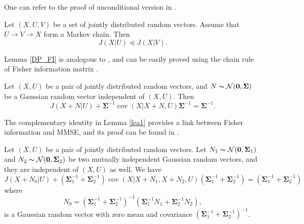 \documentclass[journal,final, onecolumn]{IEEEtran}
\DeclareMathOperator{\cov}{cov}
\begin{document}
One can refer to the proof of unconditional version in \cite[Theorem 20]{DCT91}.
\smallskip
\begin{lemma}  \label{DP_FI}
Let $({X}, U, V)$ be a set of jointly distributed random vectors. Assume that $U \rightarrow V \rightarrow {X}$ form a Markov chain. Then
\begin{equation}
J({X} | U) \preceq J({X} | V).
\end{equation}
\end{lemma}

Lemma \ref{DP_FI} is analogous to \cite[Lemma 3]{Z98}, and can be easily proved using the chain rule of Fisher information matrix \cite[Lemma 1]{Z98}.



\begin{lemma}\label{lea1}
Let $(X, U)$ be a pair of jointly distributed random vectors, and $N \thicksim \mathcal{N}(\boldsymbol{0}, \boldsymbol{\Sigma})$ be a Gaussian random vector independent of  $(X, U)$.  Then
\begin{equation}
 J(X + N | U) + \boldsymbol{\Sigma}^{-1} \cov( X | X +  N, U) \boldsymbol{\Sigma}^{-1} = \boldsymbol{\Sigma}^{-1}. \label{eq_lea1}
 \end{equation}
\end{lemma}
\begin{remark}
The complementary identity in Lemma \ref{lea1} provides a link between Fisher information and MMSE, and its proof can be found in \cite[Corollary 1]{PV06}.
\end{remark}
\smallskip

\begin{lemma}\label{lea2}
Let $(X, U)$ be a pair of jointly distributed random vectors. Let $N_{1} \thicksim \mathcal{N}(\boldsymbol{0}, \boldsymbol{\Sigma}_{1})$ and $N_{2} \thicksim \mathcal{N}(\boldsymbol{0}, \boldsymbol{\Sigma}_{2})$ be two mutually independent Gaussian random vectors, and they are independent of $(X,U)$ as well. We have
\begin{equation}\label{eq_lea2}
J(X+N_{0}|U)+\left( \boldsymbol{\Sigma}_{1}^{-1} +  \boldsymbol{\Sigma}_{2}^{-1} \right) \cov(X|X+N_{1},X+N_{2},U) \left( \boldsymbol{\Sigma}_{1}^{-1} +  \boldsymbol{\Sigma}_{2}^{-1} \right) = \left( \boldsymbol{\Sigma}_{1}^{-1} +  \boldsymbol{\Sigma}_{2}^{-1} \right)
\end{equation}
where
\begin{equation}
N_{0}= \left( \boldsymbol{\Sigma}_{1}^{-1} + \boldsymbol{\Sigma}_{2}^{-1}\right)^{-1} \left(  \boldsymbol{\Sigma}_{1}^{-1} N_{1} +    \boldsymbol{\Sigma}_{2}^{-1} N_{2} \right),
\end{equation}
is a Gaussian random vector with zero mean and covariance $\left( \boldsymbol{\Sigma}_{1}^{-1} + \boldsymbol{\Sigma}_{2}^{-1}\right)^{-1}$.
\end{lemma}
\end{document}
